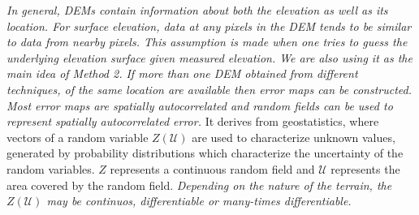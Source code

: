 \documentclass[12pt]{article}
\begin{document}
\textit{In general, DEMs contain information about both the elevation as well as 
its location. For surface elevation, data at any pixels in the DEM tends to be 
similar to data from nearby pixels. This assumption is made when one tries to guess
the underlying elevation surface given measured elevation. We are also using
it as the main idea of Method 2. If more than one DEM obtained
from different techniques, of the same location are available then error maps can be
constructed. Most error maps are spatially autocorrelated and random fields can be
used to represent spatially autocorrelated error.} 
It derives from geostatistics, where vectors of
a random variable $Z(\mathcal{U})$ are used to characterize unknown
values, generated by probability distributions which characterize the
uncertainty of the random variables. $Z$ represents a continuous
random field and $\mathcal{U}$ represents the area covered by the
random field. 
\textit{Depending on the nature of the terrain, the $Z(\mathcal{U})$ may be continuos, differentiable
or many-times differentiable.}
\end{document}
